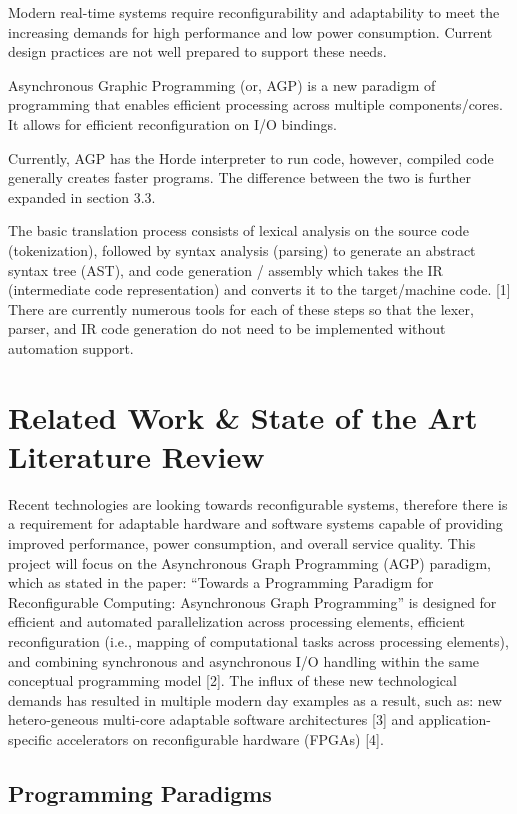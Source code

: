 \documentclass[11pt]{article}
\begin{document}
Modern real-time systems require reconfigurability and adaptability to meet the increasing demands for high performance and low power consumption. Current design practices are not well prepared to support these needs. 

Asynchronous Graphic Programming (or, AGP) is a new paradigm of programming that enables efficient processing across multiple components/cores. It allows for efficient reconfiguration on I/O bindings. 

Currently, AGP has the Horde interpreter to run code, however, compiled code generally creates faster programs. The difference between the two is further expanded in section 3.3.

The basic translation process consists of lexical analysis on the source code (tokenization), followed by syntax analysis (parsing) to generate an abstract syntax tree (AST), and code generation / assembly which takes the IR (intermediate code representation) and converts it to the target/machine code. [1] There are currently numerous tools for each of these steps so that the lexer, parser, and IR code generation do not need to be implemented without automation support. 


\section{Related Work \& State of the Art Literature Review}

Recent technologies are looking towards reconfigurable systems, therefore there is a requirement for adaptable hardware and software systems capable of  providing improved performance, power consumption, and overall service quality. This project will focus on the Asynchronous Graph Programming (AGP) paradigm, which as stated in the paper: “Towards a Programming Paradigm for Reconfigurable Computing: Asynchronous Graph Programming” is designed for efficient and automated parallelization across processing elements, efficient reconfiguration (i.e., mapping of computational tasks across processing elements), and combining synchronous and asynchronous I/O handling within the same conceptual programming model [2]. The influx of these new technological demands has resulted in multiple modern day examples as a result, such as: new hetero-geneous multi-core adaptable software architectures [3] and application-specific accelerators on reconfigurable hardware (FPGAs) [4].

\subsection{Programming Paradigms}
\end{document}
